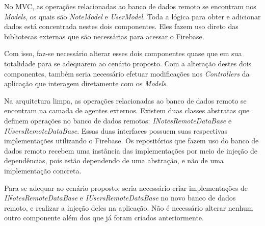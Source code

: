 No MVC, as operações relacionadas ao banco de dados remoto se encontram nos \emph{Models}, os quais são \emph{NoteModel} e \emph{UserModel}.
Toda a lógica para obter e adicionar dados está concentrada nestes dois componentes.
Eles fazem uso direto das bibliotecas externas que são necessárias para acessar o Firebase.

Com isso, faz-se necessário alterar esses dois componentes quase que em sua totalidade para se adequarem ao cenário proposto.
Com a alteração destes dois componentes, também seria necessário efetuar modificações nos \emph{Controllers} da aplicação que interagem diretamente com os \emph{Models}.

Na arquitetura limpa, as operações relacionadas ao banco de dados remoto se encontram na camada de agentes externos.
Existem duas classes abstratas que definem operações no banco de dados remotos: \emph{INotesRemoteDataBase} e \emph{IUsersRemoteDataBase}.
Essas duas interfaces possuem suas respectivas implementações utilizando o Firebase.
Os repositórios que fazem uso do banco de dados remoto recebem uma instância das implementações por meio de injeção de dependências, pois estão dependendo de uma abstração, e não de uma implementação concreta.

Para se adequar ao cenário proposto, seria necessário criar implementações de \emph{INotesRemoteDataBase} e \emph{IUsersRemoteDataBase} no novo banco de dados remoto, e realizar a injeção deles na aplicação.
Não é necessário alterar nenhum outro componente além dos que já foram criados anteriormente.